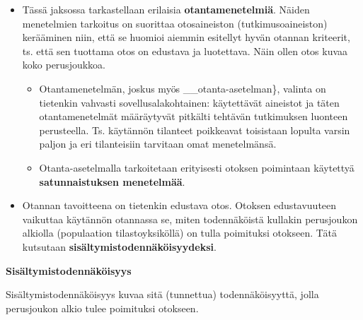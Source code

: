 \documentclass[
]{book}
\providecommand{\tightlist}{%
  \setlength{\itemsep}{0pt}\setlength{\parskip}{0pt}}
\begin{document}
\begin{itemize}
\tightlist
\item
  Tässä jaksossa tarkastellaan erilaisia \textbf{otantamenetelmiä}. Näiden menetelmien tarkoitus on suorittaa otosaineiston (tutkimusoaineiston) kerääminen niin, että se huomioi aiemmin esitellyt hyvän otannan kriteerit, ts. että sen tuottama otos on edustava ja luotettava. Näin ollen otos kuvaa koko perusjoukkoa.

  \begin{itemize}
  \tightlist
  \item
    Otantamenetelmän, joskus myös \_\_otanta-asetelman\}, valinta on tietenkin vahvasti sovellusalakohtainen: käytettävät aineistot ja täten otantamenetelmät määräytyvät pitkälti tehtävän tutkimuksen luonteen perusteella. Ts. käytännön tilanteet poikkeavat toisistaan lopulta varsin paljon ja eri tilanteisiin tarvitaan omat menetelmänsä.
  \item
    Otanta-asetelmalla tarkoitetaan erityisesti otoksen poimintaan käytettyä \textbf{satunnaistuksen menetelmää}.
  \end{itemize}
\item
  Otannan tavoitteena on tietenkin edustava otos. Otoksen edustavuuteen vaikuttaa käytännön otannassa se, miten todennäköistä kullakin perusjoukon alkiolla (populaation tilastoyksiköllä) on tulla poimituksi otokseen. Tätä kutsutaan \textbf{sisältymistodennäköisyydeksi}.
\end{itemize}

\begin{noteblock}{}
\textbf{Sisältymistodennäköisyys}

Sisältymistodennäköisyys kuvaa sitä (tunnettua) todennäköisyyttä, jolla perusjoukon alkio tulee poimituksi otokseen.

\end{noteblock}
\end{document}
